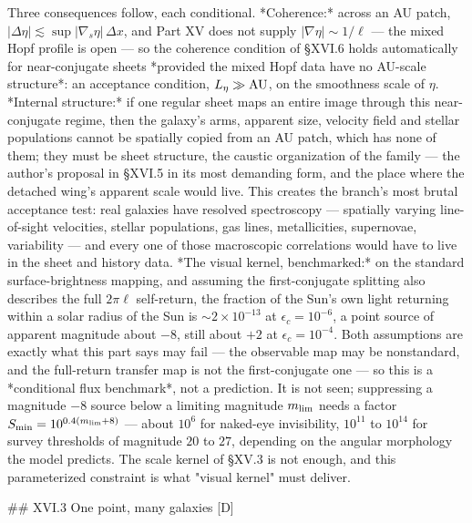 Three consequences follow, each conditional. *Coherence:* across an AU patch, $|\Delta\eta|\lesssim\sup|\nabla_s\eta|\,\Delta x$, and Part XV does not supply $|\nabla\eta|\sim1/\ell$ — the mixed Hopf profile is open — so the coherence condition of §XVI.6 holds automatically for near-conjugate sheets *provided the mixed Hopf data have no AU-scale structure*: an acceptance condition, $L_\eta\gg{\rm AU}$, on the smoothness scale of $\eta$. *Internal structure:* if one regular sheet maps an entire image through this near-conjugate regime, then the galaxy's arms, apparent size, velocity field and stellar populations cannot be spatially copied from an AU patch, which has none of them; they must be sheet structure, the caustic organization of the family — the author's proposal in §XVI.5 in its most demanding form, and the place where the detached wing's apparent scale would live. This creates the branch's most brutal acceptance test: real galaxies have resolved spectroscopy — spatially varying line-of-sight velocities, stellar populations, gas lines, metallicities, supernovae, variability — and every one of those macroscopic correlations would have to live in the sheet and history data. *The visual kernel, benchmarked:* on the standard surface-brightness mapping, and assuming the first-conjugate splitting also describes the full $2\pi\ell$ self-return, the fraction of the Sun's own light returning within a solar radius of the Sun is $\sim2\times10^{-13}$ at $\epsilon_c = 10^{-6}$, a point source of apparent magnitude about $-8$, still about $+2$ at $\epsilon_c = 10^{-4}$. Both assumptions are exactly what this part says may fail — the observable map may be nonstandard, and the full-return transfer map is not the first-conjugate one — so this is a *conditional flux benchmark*, not a prediction. It is not seen; suppressing a magnitude $-8$ source below a limiting magnitude $m_{\rm lim}$ needs a factor $S_{\min} = 10^{0.4(m_{\rm lim}+8)}$ — about $10^6$ for naked-eye invisibility, $10^{11}$ to $10^{14}$ for survey thresholds of magnitude $20$ to $27$, depending on the angular morphology the model predicts. The scale kernel of §XV.3 is not enough, and this parameterized constraint is what "visual kernel" must deliver.

## XVI.3 One point, many galaxies [D]


